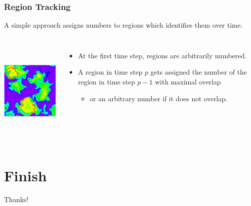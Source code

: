 \documentclass[11pt]{beamer}
\begin{document}
\begin{frame}
	\frametitle{Region Tracking}

	A simple approach assigns numbers to regions which identifies them over time.
	\begin{columns}[c]
		\includegraphics[height=5cm]{regions.png}
		\pause
		\begin{itemize}
			\item At the first time step, regions are arbitrarily numbered.
			\pause
			\item A region in time step $p$ gets assigned the number of the region in time step $p-1$ with maximal overlap
			\begin{itemize}
				\item or an arbitrary number if it does not overlap.
			\end{itemize}
		\end{itemize}
	\end{columns}
\end{frame}

\section[Finish]{Finish}

\begin{frame}
	\Large{Thanks!}
\end{frame}
\end{document}
